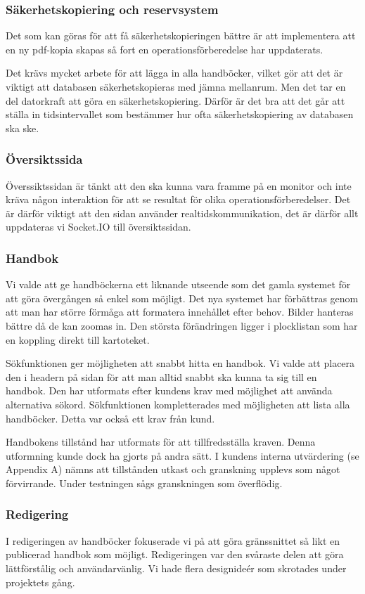 \documentclass{article}
\begin{document}
\subsubsection{Säkerhetskopiering och reservsystem}
Det som kan göras för att få säkerhetskopieringen bättre är att implementera att en ny pdf-kopia skapas så fort en operationsförberedelse har uppdaterats.

Det krävs mycket arbete för att lägga in alla handböcker, vilket gör att det är viktigt att databasen säkerhetskopieras med jämna mellanrum. Men det tar en del datorkraft att göra en säkerhetskopiering. Därför är det bra att det går att ställa in tidsintervallet som bestämmer hur ofta säkerhetskopiering av databasen ska ske.

\subsubsection{Översiktssida}
Överssiktssidan är tänkt att den ska kunna vara framme på en monitor och inte kräva någon interaktion för att se resultat för olika operationsförberedelser. Det är därför viktigt att den sidan använder realtidskommunikation, det är därför allt uppdateras vi Socket.IO till översiktssidan. 

\subsubsection{Handbok}
Vi valde att ge handböckerna ett liknande utseende som det gamla systemet för att göra övergången så enkel som möjligt. Det nya systemet har förbättras genom att man har större förmåga att formatera innehållet efter behov. Bilder hanteras bättre då de kan zoomas in.
Den största förändringen ligger i plocklistan som har en koppling direkt till kartoteket.

Sökfunktionen ger möjligheten att snabbt hitta en handbok. Vi valde att placera den i headern på sidan för att man alltid snabbt ska kunna ta sig till en handbok. Den har utformats efter kundens krav med möjlighet att använda alternativa sökord.
Sökfunktionen kompletterades med möjligheten att lista alla handböcker. Detta var också ett krav från kund. 

Handbokens tillstånd har utformats för att tillfredsställa kraven. Denna utformning kunde dock ha gjorts på andra sätt. I kundens interna utvärdering (se Appendix A) nämns att tillstånden utkast och granskning upplevs som något förvirrande. Under testningen sågs granskningen som överflödig.
\subsubsection{Redigering}
I redigeringen av handböcker fokuserade vi på att göra gränssnittet så likt en publicerad handbok som möjligt. Redigeringen var den svåraste delen att göra lättförstålig och användarvänlig. Vi hade flera designideér som skrotades under projektets gång.
\end{document}
